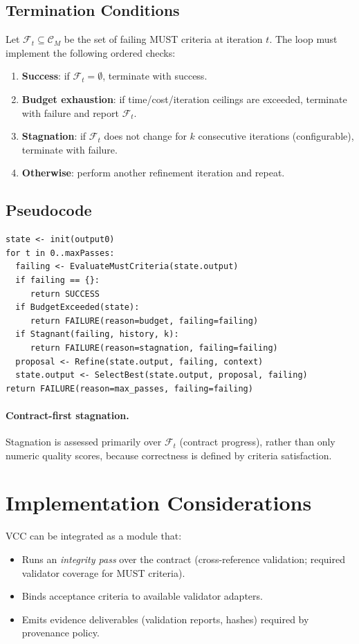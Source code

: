 \documentclass[11pt]{article}
\begin{document}
\subsection{Termination Conditions}
Let $\mathcal{F}_t \subseteq \mathcal{C}_M$ be the set of failing MUST criteria at iteration $t$.
The loop must implement the following ordered checks:
\begin{enumerate}[leftmargin=*]
  \item \textbf{Success}: if $\mathcal{F}_t = \emptyset$, terminate with success.
  \item \textbf{Budget exhaustion}: if time/cost/iteration ceilings are exceeded, terminate with failure and report $\mathcal{F}_t$.
  \item \textbf{Stagnation}: if $\mathcal{F}_t$ does not change for $k$ consecutive iterations (configurable), terminate with failure.
  \item \textbf{Otherwise}: perform another refinement iteration and repeat.
\end{enumerate}

\subsection{Pseudocode}
\begin{verbatim}
state <- init(output0)
for t in 0..maxPasses:
  failing <- EvaluateMustCriteria(state.output)
  if failing == {}:
     return SUCCESS
  if BudgetExceeded(state):
     return FAILURE(reason=budget, failing=failing)
  if Stagnant(failing, history, k):
     return FAILURE(reason=stagnation, failing=failing)
  proposal <- Refine(state.output, failing, context)
  state.output <- SelectBest(state.output, proposal, failing)
return FAILURE(reason=max_passes, failing=failing)
\end{verbatim}

\paragraph{Contract-first stagnation.} Stagnation is assessed primarily over $\mathcal{F}_t$ (contract progress), rather than only numeric quality scores, because correctness is defined by criteria satisfaction.

\section{Implementation Considerations}
VCC can be integrated as a module that:
\begin{itemize}[leftmargin=*]
  \item Runs an \emph{integrity pass} over the contract (cross-reference validation; required validator coverage for MUST criteria).
  \item Binds acceptance criteria to available validator adapters.
  \item Emits evidence deliverables (validation reports, hashes) required by provenance policy.
\end{itemize}
\end{document}
